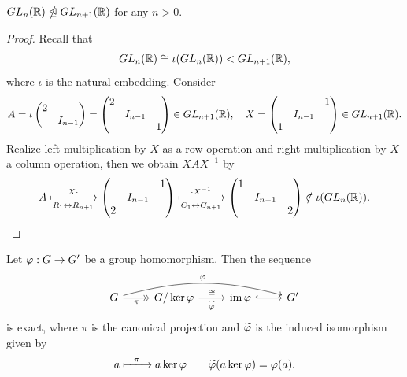 \begin{example}
  \(GL_n(\mathbb{R}) \ntrianglelefteq GL_{n+1}(\mathbb{R})\) for any \(n > 0\).
\end{example}
\begin{proof}
  Recall that \[
    GL_n(\mathbb{R}) \cong \iota(GL_n(\mathbb{R})) < GL_{n+1}(\mathbb{R}),
  \] where \(\iota\) is the natural embedding.
  Consider \[
    A = \iota\begin{pmatrix}
      2 & \\
        & I_{n-1}
    \end{pmatrix} = \begin{pmatrix}
      2 &  & \\
        & I_{n-1} & \\
        &  & 1
    \end{pmatrix} \in GL_{n+1}(\mathbb{R}), \quad
    X = \begin{pmatrix}
       & & 1 \\
       & I_{n-1} & \\
      1 & &
    \end{pmatrix}\in GL_{n+1}(\mathbb{R}).
  \]
  Realize left multiplication by \(X\) as a row operation and right multiplication by \(X\) a column operation, then we obtain \(XAX^{-1}\) by \begin{align*}
    A \xmapsto[R_1\leftrightarrow R_{n+1}]{X\cdot} \begin{pmatrix}
        &  & 1 \\
        & I_{n-1} & \\
      2 &  &
    \end{pmatrix} \xmapsto[C_1\leftrightarrow C_{n+1}]{\cdot X^{-1}} \begin{pmatrix}
      1 &  &   \\
        & I_{n-1} & \\
        &  & 2
    \end{pmatrix}\notin \iota(GL_n(\mathbb{R})).
  \end{align*}
\end{proof}

\begin{theorem}
  Let \(\varphi:G\to G'\) be a group homomorphism. Then the sequence \[
    \begin{tikzcd}
      G \ar[bend left=15]{rrr}{\f} \ar[->>]{r}[']{\pi} & G/\ker\f \ar{r}{\cong}[']{\wt\f} & \im\f \ar[hook]{r} & G'
    \end{tikzcd}
  \] is exact, where \(\pi\) is the canonical projection and \(\widetilde{\varphi}\) is the induced isomorphism given by \[
    a \xmapsto[\hspace*{2em}]{\pi} a\ker\varphi
    \qquad
    \widetilde{\varphi}(a\ker\varphi) = \varphi(a).
  \]
\end{theorem}

